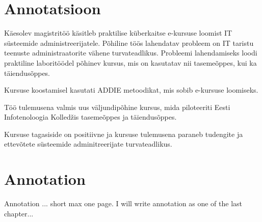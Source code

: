 \clearpage
\chapter*{Annotatsioon}
\label{annotatsioon}
\thispagestyle{empty}

Käesolev magistritöö käsitleb praktilise küberkaitse e-kursuse loomist IT süsteemide administreerijatele. Põhiline töös lahendatav probleem on IT taristu teenuste administraatorite vähene turvateadlikus. Probleemi lahendamiseks loodi praktiline laboritöödel põhinev kursus, mis on kasutatav nii tasemeõppes, kui ka täiendusõppes.

Kursuse koostamisel kasutati \gls{ADDIE} metoodikat, mis sobib e-kursuse loomiseks.

Töö tulemusena valmis uus väljundipõhine kursus, mida piloteeriti Eesti Infotenoloogia Kolledžis tasemeõppes ja täiendusõppes.

Kursuse tagasiside on positiivne ja kursuse tulemusena paraneb tudengite ja ettevõtete süsteemide adminitreerijate turvateadlikus.

\clearpage
\chapter*{Annotation}
\label{annotation}
\thispagestyle{empty}


Annotation ... short max one page. I will write annotation as one of the last chapter...
